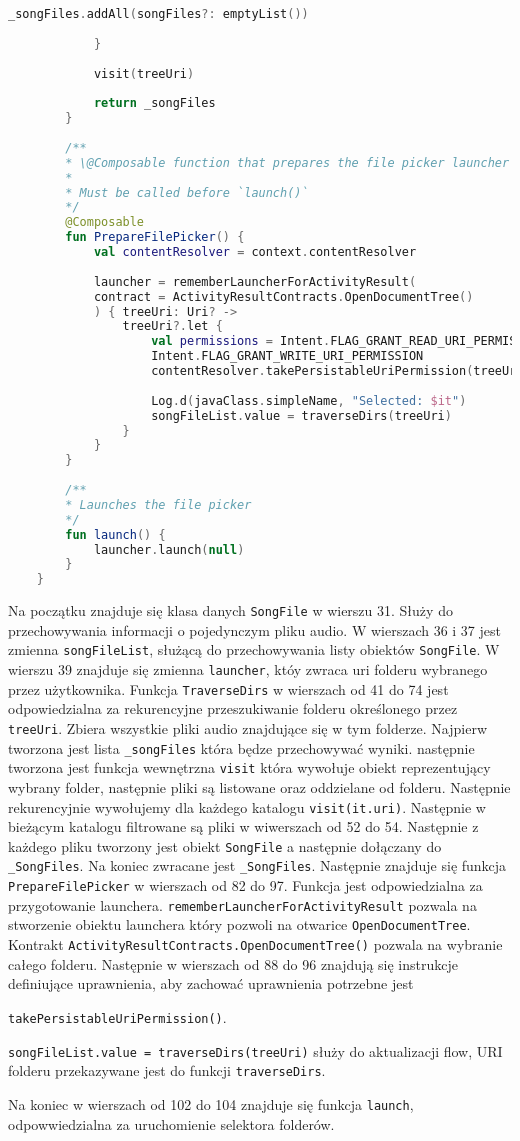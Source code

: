 \begin{lstlisting}[caption=Kod \texttt{MusicFileLoader}, label={lst:mfl-fullcode}, language=kotlin]
				_songFiles.addAll(songFiles?: emptyList())
				
			}
			
			visit(treeUri)
			
			return _songFiles
		}
		
		/**
		* \@Composable function that prepares the file picker launcher
		*
		* Must be called before `launch()`
		*/
		@Composable
		fun PrepareFilePicker() {
			val contentResolver = context.contentResolver
			
			launcher = rememberLauncherForActivityResult(
			contract = ActivityResultContracts.OpenDocumentTree()
			) { treeUri: Uri? ->
				treeUri?.let {
					val permissions = Intent.FLAG_GRANT_READ_URI_PERMISSION or
					Intent.FLAG_GRANT_WRITE_URI_PERMISSION
					contentResolver.takePersistableUriPermission(treeUri, permissions)
					
					Log.d(javaClass.simpleName, "Selected: $it")
					songFileList.value = traverseDirs(treeUri)
				}
			}
		}
		
		/**
		* Launches the file picker
		*/
		fun launch() {
			launcher.launch(null)
		}
	}
\end{lstlisting}
Na początku znajduje się klasa danych \texttt{SongFile} w wierszu 31. Służy do przechowywania informacji o pojedynczym pliku audio.
W wierszach 36 i 37 jest zmienna \texttt{songFileList}, służącą do przechowywania listy obiektów \texttt{SongFile}.
W wierszu 39 znajduje się zmienna \texttt{launcher}, któy zwraca uri folderu wybranego przez użytkownika.
Funkcja \texttt{TraverseDirs} w wierszach od 41 do 74 jest odpowiedzialna za rekurencyjne przeszukiwanie folderu określonego przez \texttt{treeUri}. Zbiera wszystkie pliki audio znajdujące się w tym folderze.
Najpierw tworzona jest lista \texttt{\_songFiles} która będze przechowywać wyniki. następnie tworzona jest funkcja wewnętrzna \texttt{visit} która wywołuje obiekt reprezentujący wybrany folder, następnie pliki są listowane oraz oddzielane od folderu. Następnie rekurencyjnie wywołujemy dla każdego katalogu \texttt{visit(it.uri)}. Następnie w bieżącym katalogu filtrowane są pliki w wiwerszach od 52 do 54. Następnie z każdego pliku tworzony jest obiekt \texttt{SongFile} a następnie dołączany do \texttt{\_SongFiles}.
Na koniec zwracane jest \texttt{\_SongFiles}.
Następnie znajduje się funkcja \texttt{PrepareFilePicker} w wierszach od 82 do 97. Funkcja jest odpowiedzialna za przygotowanie launchera.
\texttt{rememberLauncherForActivityResult} 
pozwala na stworzenie obiektu launchera który pozwoli na otwarice \texttt{OpenDocumentTree}.
Kontrakt \texttt{ActivityResultContracts.OpenDocumentTree()} pozwala na wybranie całego folderu. Następnie w wierszach od 88 do 96 znajdują się instrukcje definiujące uprawnienia, aby zachować uprawnienia potrzebne jest

\texttt{takePersistableUriPermission()}.

\texttt{songFileList.value = traverseDirs(treeUri)} służy do aktualizacji flow, URI folderu przekazywane jest do funkcji \texttt{traverseDirs}.

Na koniec w wierszach od 102 do 104 znajduje się funkcja \texttt{launch}, odpowwiedzialna za uruchomienie selektora folderów.